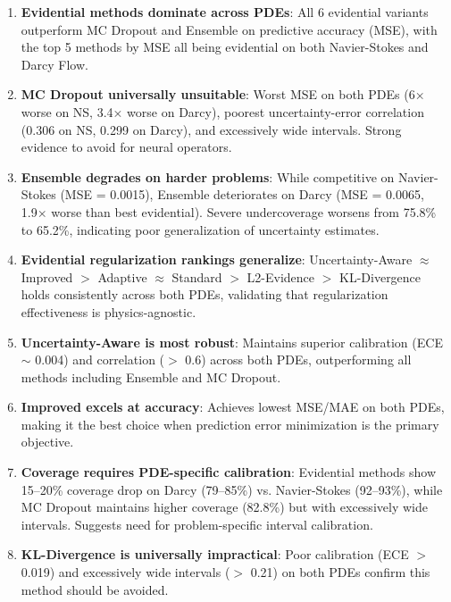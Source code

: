\begin{enumerate}
\item \textbf{Evidential methods dominate across PDEs}: All 6 evidential variants outperform MC Dropout and Ensemble on predictive accuracy (MSE), with the top 5 methods by MSE all being evidential on both Navier-Stokes and Darcy Flow.

\item \textbf{MC Dropout universally unsuitable}: Worst MSE on both PDEs (6× worse on NS, 3.4× worse on Darcy), poorest uncertainty-error correlation (0.306 on NS, 0.299 on Darcy), and excessively wide intervals. Strong evidence to avoid for neural operators.

\item \textbf{Ensemble degrades on harder problems}: While competitive on Navier-Stokes (MSE = 0.0015), Ensemble deteriorates on Darcy (MSE = 0.0065, 1.9× worse than best evidential). Severe undercoverage worsens from 75.8\% to 65.2\%, indicating poor generalization of uncertainty estimates.

\item \textbf{Evidential regularization rankings generalize}: Uncertainty-Aware $\approx$ Improved $>$ Adaptive $\approx$ Standard $>$ L2-Evidence $>$ KL-Divergence holds consistently across both PDEs, validating that regularization effectiveness is physics-agnostic.

\item \textbf{Uncertainty-Aware is most robust}: Maintains superior calibration (ECE $\sim$ 0.004) and correlation ($>$ 0.6) across both PDEs, outperforming all methods including Ensemble and MC Dropout.

\item \textbf{Improved excels at accuracy}: Achieves lowest MSE/MAE on both PDEs, making it the best choice when prediction error minimization is the primary objective.

\item \textbf{Coverage requires PDE-specific calibration}: Evidential methods show 15--20\% coverage drop on Darcy (79--85\%) vs. Navier-Stokes (92--93\%), while MC Dropout maintains higher coverage (82.8\%) but with excessively wide intervals. Suggests need for problem-specific interval calibration.

\item \textbf{KL-Divergence is universally impractical}: Poor calibration (ECE $>$ 0.019) and excessively wide intervals ($>$ 0.21) on both PDEs confirm this method should be avoided.
\end{enumerate}

